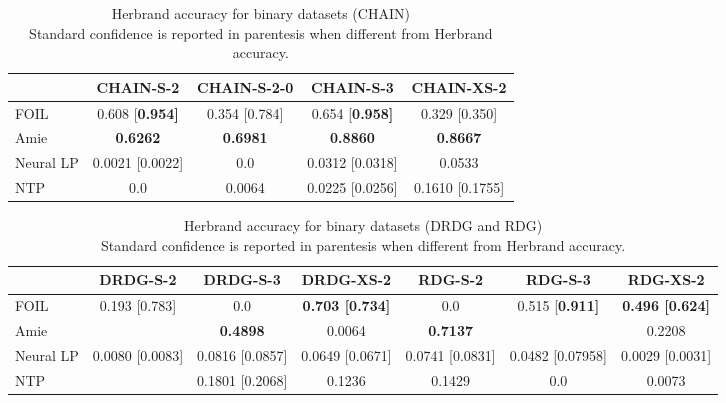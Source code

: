 
\begin{table*}[t!]
    \centering
    \begin{tabular}{|l|c|c|c|c|}
    \hline
     &  CHAIN-S-2 & CHAIN-S-2-0 &  CHAIN-S-3 &  CHAIN-XS-2 \\\hline
     FOIL & 0.608 [\bf{0.954}] & 0.354 [0.784] & 0.654 [\bf{0.958}] & 0.329 [0.350] \\\hline
     Amie & \bf{0.6262} & \bf{0.6981} & \bf{0.8860} & \bf{0.8667} \\\hline
     Neural LP & 0.0021 [0.0022] & 0.0 & 0.0312 [0.0318]& 0.0533\\\hline
     NTP  &0.0 & 0.0064 & 0.0225 [0.0256] & 0.1610 [0.1755] \\\hline
    \end{tabular}
    \caption{\centering Herbrand accuracy for binary datasets (CHAIN)\\ Standard confidence is reported in parentesis when different from Herbrand accuracy.}
    \label{tab:results}
\end{table*}


\begin{table*}[t!]
    \centering
    \begin{tabular}{|l|c|c|c|c|c|c|}
    \hline
     &  DRDG-S-2 &  DRDG-S-3 &  DRDG-XS-2 & RDG-S-2 & RDG-S-3 & RDG-XS-2\\\hline
     FOIL &0.193 [0.783] & 0.0 & \bf{0.703} [\bf{0.734}] & 0.0 & 0.515 [\bf{0.911}]& \bf{0.496} [\bf{0.624}] \\\hline
     Amie  &  & \bf{0.4898} & 0.0064 & \bf{0.7137} & & 0.2208 \\\hline
     Neural LP & 0.0080 [0.0083]& 0.0816 [0.0857] &0.0649 [0.0671] & 0.0741 [0.0831] & 0.0482 [0.07958] &0.0029 [0.0031] \\\hline
     NTP & & 0.1801 [0.2068]& 0.1236 & 0.1429 & 0.0 &0.0073\\\hline
    \end{tabular}
    \caption{\centering Herbrand accuracy for binary datasets (DRDG and RDG)\\ Standard confidence is reported in parentesis when different from Herbrand accuracy.}
    \label{tab:results}
\end{table*}

